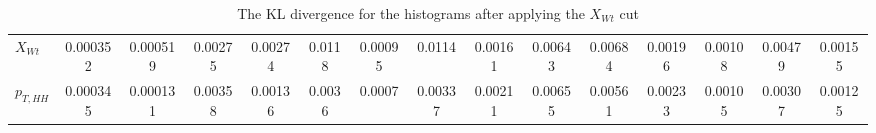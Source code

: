 \begin{table}
\begin{adjustbox}{width=\columnwidth,center}
\begin{tabular}{lcccccccccccccc}
$X_{Wt}$           & 0.000352 & 0.000519 &  0.00275 &  0.00274 &     0.0118 &  0.00095 &      0.0114 &  0.00161 &     0.00643 & 0.00684 &    0.00196 & 0.00108 & 0.00479 &  0.00155 \\
$p_{T,HH}$         & 0.000345 & 0.000131 &  0.00358 &  0.00136 &     0.0036 &   0.0007 &     0.00337 &  0.00211 &     0.00655 & 0.00561 &    0.00233 & 0.00105 & 0.00307 &  0.00125 \\
\bottomrule
\end{tabular}
\end{adjustbox}\caption{The KL divergence for the histograms after applying the $X_{Wt}$ cut}\end{table}
